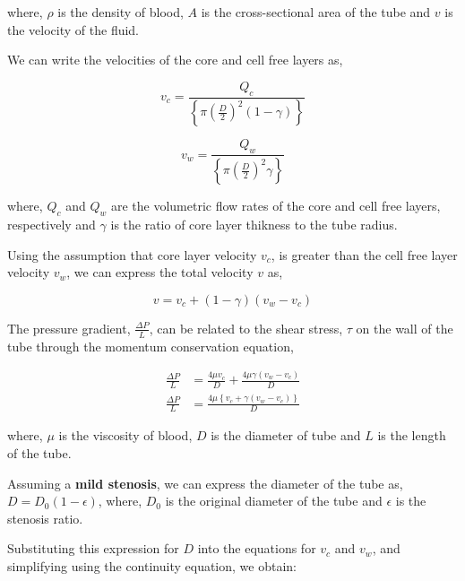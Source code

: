 \documentclass[12pt, a4paper]{article} %
\begin{document}
where, $\rho$ is the density of blood, $A$ is the cross-sectional area of the tube and $v$ is the velocity of the fluid.

We can write the velocities of the core and cell free layers as,


\begin{equation*}
    v_c = \frac{Q_c}{\left\{\pi \left(\frac{D}{2}\right)^2\left(1 - \gamma\right)\right\}}
\end{equation*}


\begin{equation*}
    v_w = \frac{Q_w}{\left\{\pi \left(\frac{D}{2}\right)^2 \gamma\right\}}
\end{equation*}

where, $Q_c$ and $Q_w$ are the volumetric flow rates of the core and cell free layers, respectively and $\gamma$ is the ratio of core layer thikness to the tube radius.

Using the assumption that core layer velocity $v_c$, is greater than the cell free layer velocity $v_w$, we can express the total velocity $v$ as,

\begin{equation*}
    v = v_c + \left(1 - \gamma\right)\left(v_w - v_c\right)
\end{equation*}

The pressure gradient, $\displaystyle \frac{\Delta P}{L}$, can be related to the shear stress, $\tau$ on the wall of the tube through the momentum conservation equation,

\begin{equation*}
    \begin{split}
        \frac{\Delta P}{L} & = \frac{4 \mu v_c}{D} + \frac{4 \mu \gamma \left(v_w - v_c\right)}{D}\\[3mm]
        \frac{\Delta P}{L} & = \frac{4\mu \left\{v_c + \gamma\left(v_w - v_c\right)\right\}}{D}
    \end{split}
\end{equation*}

where, $\mu$ is the viscosity of blood, $D$ is the diameter of tube and $L$ is the length of the tube.

Assuming a {\bf mild stenosis}, we can express the diameter of the tube as, $D = D_0\left(1-\epsilon\right)$, where, $D_0$ is the original diameter of the tube and $\epsilon$ is the stenosis ratio.

Substituting this expression for $D$ into the equations for $v_c$ and $v_w$, and simplifying using the continuity equation, we obtain:
\end{document}
